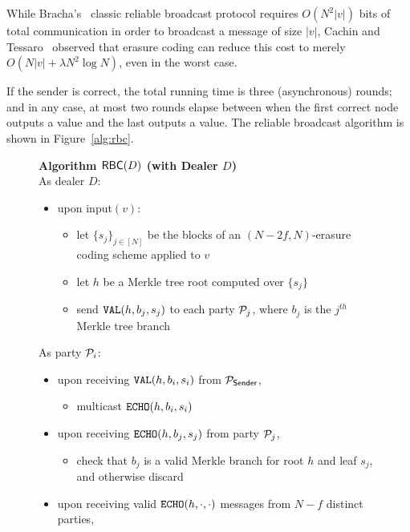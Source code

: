 \documentclass{sig-alternate-05-2015}
\begin{document}
While Bracha's~\cite{bra87} classic reliable broadcast protocol requires $O(N^2|v|)$ bits of total communication in order to broadcast a message of size $|v|$, Cachin and Tessaro~\cite{dispersal} observed that erasure coding can reduce this cost to merely $O(N|v| + \lambda N^2 \log N)$, even in the worst case. 
%
%

If the sender is correct, the total running time is three (asynchronous) rounds; and in any case, at most two rounds elapse between when the first correct node outputs a value and the last outputs a value. The reliable broadcast algorithm is shown in Figure~\ref{alg:rbc}.

\begin{figure}[t]
\begin{boxedminipage}{\columnwidth}
{\centering \textbf{Algorithm $\msf{RBC}(D)$ (with Dealer $D$)} \\}
As dealer $D$:
\begin{itemize}
\item upon input$(v)$:
  \begin{itemize}
  \item[] let $\{s_j\}_{j\in[N]}$ be the blocks of an $(N-2f,N)$-erasure coding scheme applied to $v$
  \item[] let $h$ be a Merkle tree root computed over $\{s_j\}$
  \item[] send $\mtt{VAL}(h, b_j, s_j)$ to each party $\P_j$, where $b_j$ is the $j^{th}$ Merkle tree branch
  \end{itemize}
\end{itemize}
As party $\P_i$:
\begin{itemize}
\item upon receiving $\mtt{VAL}(h, b_i, s_i)$ from $\P_\msf{Sender}$,
  \begin{itemize}
  \item[] multicast $\mtt{ECHO}(h,b_i,s_i)$
  \end{itemize} 
\item upon receiving $\mtt{ECHO}(h,b_j,s_j)$ from party $\P_j$, 
  \begin{itemize}
  \item[] check that $b_j$ is a valid Merkle branch for root $h$ and leaf $s_j$, and otherwise discard
  \end{itemize}
\item upon receiving valid $\mtt{ECHO}(h,\cdot,\cdot)$ messages from $N-f$ distinct parties,

\end{itemize}
\end{boxedminipage}
\end{figure}
\end{document}
